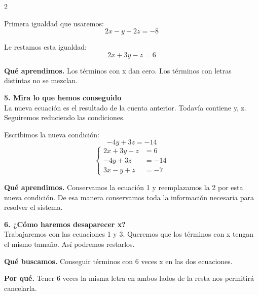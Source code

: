 \documentclass[11pt,a4paper,landscape]{article}
\begin{document}
\begin{multicols*}{2}
\begin{minipage}{\linewidth}
\par\smallskip Primera igualdad que usaremos:
\[2x - y + 2z = -8\]
\par\smallskip Le restamos esta igualdad:
\[2x + 3y - z = 6\]
\par\smallskip\textbf{Qué aprendimos.} Los términos con x dan cero. Los términos con letras distintas no se mezclan.
\end{minipage}\par\medskip
\noindent\begin{minipage}{\linewidth}\textbf{5. Mira lo que hemos conseguido}\\[2pt]La nueva ecuación es el resultado de la cuenta anterior. Todavía contiene y, z. Seguiremos reduciendo las condiciones.
\par\smallskip Escribimos la nueva condición:
\[-4y + 3z = -14\]
\[\left\{\begin{aligned}2x + 3y - z &= 6\\-4y + 3z &= -14\\3x - y + z &= -7\end{aligned}\right.\]
\par\smallskip\textbf{Qué aprendimos.} Conservamos la ecuación 1 y reemplazamos la 2 por esta nueva condición. De esa manera conservamos toda la información necesaria para resolver el sistema.
\end{minipage}\par\medskip
\noindent\begin{minipage}{\linewidth}\textbf{6. ¿Cómo haremos desaparecer x?}\\[2pt]Trabajaremos con las ecuaciones 1 y 3. Queremos que los términos con x tengan el mismo tamaño. Así podremos restarlos.
\par\smallskip\textbf{Qué buscamos.} Conseguir términos con 6 veces x en las dos ecuaciones.
\par\smallskip\textbf{Por qué.} Tener 6 veces la misma letra en ambos lados de la resta nos permitirá cancelarla.
\par{}\par\smallskip

\end{minipage}
\end{multicols*}
\end{document}
